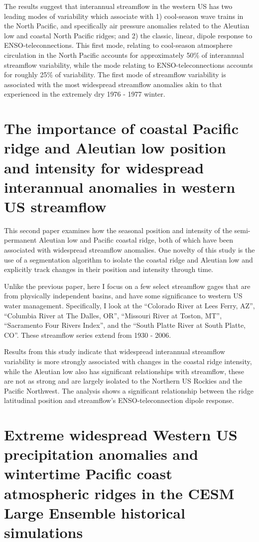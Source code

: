 \documentclass[final, double]{ua-thesis}
\begin{document}
The results suggest that interannual streamflow in the western US has two leading modes of variability which associate with 1) cool-season wave trains in the North Pacific, and specifically air pressure anomalies related to the Aleutian low and coastal North Pacific ridges; and 2) the classic, linear, dipole response to ENSO-teleconnections. This first mode, relating to cool-season atmosphere circulation in the North Pacific accounts for approximately 50\% of interannual streamflow variability, while the mode relating to ENSO-teleconnections accounts for roughly 25\% of variability. The first mode of streamflow variability is associated with the most widespread streamflow anomalies akin to that experienced in the extremely dry 1976 - 1977 winter.

\section{The importance of coastal Pacific ridge and Aleutian low position and intensity for widespread interannual anomalies in western US streamflow}

This second paper examines how the seasonal position and intensity of the semi-permanent Aleutian low and Pacific coastal ridge, both of which have been associated with widespread streamflow anomalies. One novelty of this study is the use of a segmentation algorithm to isolate the coastal ridge and Aleutian low and explicitly track changes in their position and intensity through time.

Unlike the previous paper, here I focus on a few select streamflow gages that are from physically independent basins, and have some significance to western US water management. Specifically, I look at the ``Colorado River at Lees Ferry, AZ'', ``Columbia River at The Dalles, OR'', ``Missouri River at Toston, MT'', ``Sacramento Four Rivers Index'', and the ``South Platte River at South Platte, CO''. These streamflow series extend from 1930 - 2006.

Results from this study indicate that widespread interannual streamflow variability is more strongly associated with changes in the coastal ridge intensity, while the Aleutian low also has significant relationships with streamflow, these are not as strong and are largely isolated to the Northern US Rockies and the Pacific Northwest. The analysis shows a significant relationship between the ridge latitudinal position and streamflow's ENSO-teleconnection dipole response.

\section{Extreme widespread Western US precipitation anomalies and wintertime Pacific coast atmospheric ridges in the CESM Large Ensemble historical simulations}
\end{document}
